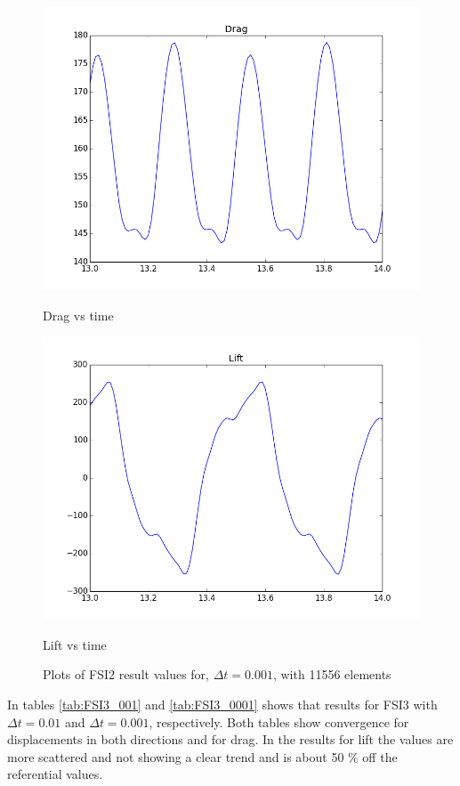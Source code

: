 \begin{figure}[H]
\begin{minipage}[b]{0.6\linewidth}
    \includegraphics[width=0.9\linewidth]{./Verification_Validation/Hron_Turek/FSI2_drag.png} 
    \caption{Drag vs time} 
    \vspace{4ex}
  \end{minipage}%
  \begin{minipage}[b]{0.6\linewidth}
    \centering
    \includegraphics[width=0.9\linewidth]{./Verification_Validation/Hron_Turek/FSI2_lift.png} 
    \caption{Lift vs time} 
    \vspace{4ex}
  \end{minipage} 
  \caption{Plots of FSI2 result values for, $\Delta t = 0.001$, with 11556 elements}
\end{figure}



In tables \ref{tab:FSI3_001} and \ref{tab:FSI3_0001} shows that results for FSI3 with $\Delta t = 0.01$ and $\Delta t = 0.001$, respectively. Both tables show convergence for displacements in both directions and for drag. In the results for lift the values are more scattered and not showing a clear trend and is about 50 \% off the referential values.

